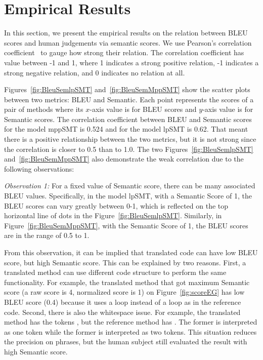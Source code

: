 \section{Empirical Results}

In this section, we present the empirical results on the relation
between BLEU scores and human judgements via semantic scores.  We use
Pearson's correlation coefficient~\cite{PearsonCorrelation} to gauge
how strong their relation. The correlation coefficient has value
between -1 and 1, where 1 indicates a strong positive relation, -1
indicates a strong negative relation, and 0 indicates no relation at
all.

Figures~\ref{fig:BleuSemlpSMT} and~\ref{fig:BleuSemMppSMT} show the
scatter plots between two metrics: BLEU and Semantic. Each point
represents the scores of a pair of methods where its $x$-axis value is
for BLEU scores and $y$-axis value is for Semantic scores. The
correlation coefficient between BLEU and Semantic scores for the model
mppSMT is 0.524 and for the model lpSMT is 0.62. That meant there is a
positive relationship between the two metrics, but it is not strong
since the correlation is closer to 0.5 than to 1.0. The two
Figures~\ref{fig:BleuSemlpSMT} and~\ref{fig:BleuSemMppSMT} also
demonstrate the weak correlation due to the following observations:

\emph{Observation 1:} For a fixed value of Semantic score, there can
be many associated BLEU values. Specifically, in the model lpSMT, with
a Semantic Score of 1, the BLEU scores can vary greatly between 0-1,
which is reflected on the top horizontal line of dots in the
Figure~\ref{fig:BleuSemlpSMT}. Similarly, in
Figure~\ref{fig:BleuSemMppSMT}, with the Semantic Score of 1, the BLEU
scores are in the range of 0.5 to 1.

From this observation, it can be implied that translated code can have
low BLEU score, but high Semantic score. This can be explained by two
reasons. First, a translated method can use different code structure
to perform the same functionality. For example, the translated method
that got maximum Semantic score (a raw score is 4, normalized score is
1) on Figure~\ref{fig:scoreEG} has low BLEU score (0.4) because it
uses a  loop instead of a  loop as in the
reference code. Second, there is also the whitespace issue. For
example, the translated method has the tokens , but the
reference method has . The former is interpreted as one
token while the former is interpreted as two tokens. This situation
reduces the precision on phrases, but the human subject still
evaluated the result with high Semantic score.

